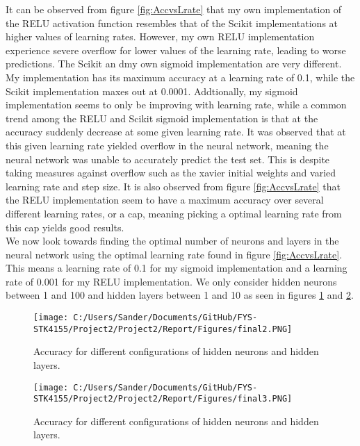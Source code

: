 \documentclass[12pt,a4paper]{article}
\begin{document}
\noindent It can be observed from figure \ref{fig:AccvsLrate} that my own implementation of the RELU activation function resembles that of the Scikit implementations at higher values of learning rates. However, my own RELU implementation experience severe overflow for lower values of the learning rate, leading to worse predictions. The Scikit an dmy own sigmoid implementation are very different. My implementation has its maximum accuracy at a learning rate of 0.1, while the Scikit implementation maxes out at 0.0001. Addtionally, my sigmoid implementation seems to only be improving with learning rate, while a common trend among the RELU and Scikit sigmoid implementation is that at the accuracy suddenly decrease at some given learning rate. It was observed that at this given learning rate yielded overflow in the neural network, meaning the neural network was unable to accurately predict the test set. This is despite taking measures against overflow such as the xavier initial weights and varied learning rate and step size. It is also observed from figure \ref{fig:AccvsLrate} that the RELU implementation seem to have a maximum accuracy over several different learning rates, or a cap, meaning picking a optimal learning rate from this cap yields good results.
\\
We now look towards finding the optimal number of neurons and layers in the neural network using the optimal learning rate found in figure \ref{fig:AccvsLrate}. This means a learning rate of 0.1 for my sigmoid implementation and a learning rate of 0.001 for my RELU implementation. We only consider hidden neurons between 1 and 100 and hidden layers between 1 and 10 as seen in figures \ref{fig:AccvsLrate2} and \ref{fig:AccvsLrate3}.

\begin{figure}[H]
\centering
\texttt{[image: C:/Users/Sander/Documents/GitHub/FYS-STK4155/Project2/Project2/Report/Figures/final2.PNG]}
\caption{\label{fig:AccvsLrate2} Accuracy for different configurations of hidden neurons and hidden layers.}
\end{figure}

\begin{figure}[H]
\centering
\texttt{[image: C:/Users/Sander/Documents/GitHub/FYS-STK4155/Project2/Project2/Report/Figures/final3.PNG]}
\caption{\label{fig:AccvsLrate3} Accuracy for different configurations of hidden neurons and hidden layers.}
\end{figure}
\end{document}

